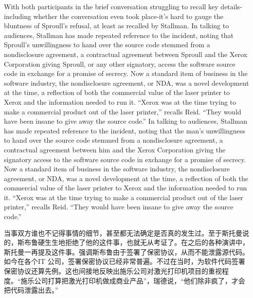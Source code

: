 \ifdefined\eng
\ifdefined\vone
With both participants in the brief conversation struggling to recall key details-including whether the conversation even took place-it's hard to gauge the bluntness of Sproull's refusal, at least as recalled by Stallman. In talking to audiences, Stallman has made repeated reference to the incident, noting that Sproull's unwillingness to hand over the source code stemmed from a nondisclosure agreement, a contractual agreement between Sproull and the Xerox Corporation giving Sproull, or any other signatory, access the software source code in exchange for a promise of secrecy. Now a standard item of business in the software industry, the nondisclosure agreement, or NDA, was a novel development at the time, a reflection of both the commercial value of the laser printer to Xerox and the information needed to run it. ``Xerox was at the time trying to make a commercial product out of the laser printer,'' recalls Reid. ``They would have been insane to give away the source code.''
\fi
\ifdefined\vtwo
In talking to audiences, Stallman has made repeated reference to the incident, noting that the man's unwillingness to hand over the source code stemmed from a nondisclosure agreement, a contractual agreement between him and the Xerox Corporation giving the signatory access to the software source code in exchange for a promise of secrecy. Now a standard item of business in the software industry, the nondisclosure agreement, or NDA, was a novel development at the time, a reflection of both the commercial value of the laser printer to Xerox and the information needed to run it. ``Xerox was at the time trying to make a commercial product out of the laser printer,'' recalls Reid. ``They would have been insane to give away the source code.''
\fi
\fi

\ifdefined\chs
当事双方谁也不记得事情的细节，甚至都无法确定是否真的发生过。至于斯托曼说的，斯布鲁硬生生地拒绝了他的这件事，也就无从考证了。在之后的各种演讲中，斯托曼一再提及这件事。强调斯布鲁由于签署了保密协议，从而不能泄露源代码。如今在各个IT 公司，签署保密协议已经非常普遍。不过在当时，为软件代码签署保密协议还算先例。这也间接地反映出施乐公司对激光打印机项目的重视程度。``施乐公司打算把激光打印机做成商业产品''，瑞德说，``他们除非疯了，才会把代码泄露出去。''
\fi

